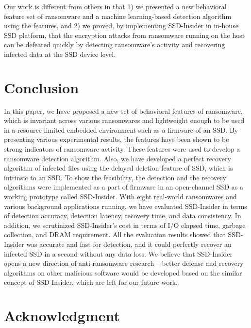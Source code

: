 \documentclass[conference]{IEEEtran}
\newcommand{\ours}{SSD-Insider}
\begin{document}
Our work is different from others in that 1) we presented a new
behavioral feature set of ransomware and a machine learning-based 
detection algorithm using the features, and
2) we proved, by implementing \ours{} in in-house SSD platform, 
that the encryption attacks from ransomware running on the host 
can be defeated quickly by detecting ransomware's activity and recovering infected data 
at the SSD device level.


\section{Conclusion}
In this paper, we have proposed a new set of behavioral features of
ransomware, which is invariant across various ransomwares and
lightweight enough to be used in a resource-limited embedded
environment such as a firmware of an SSD.  By presenting various
experimental results, the features have been shown to be strong
indicators of ransomware activity.  These features were used to
develop a ransomware detection algorithm.  Also, we have developed
a perfect recovery algorithm of infected files using the delayed
deletion feature of SSD, which is intrinsic to an SSD.  To show the
feasibility, the detection and the recovery algorithms were
implemented as a part of firmware in an open-channel SSD as a
working prototype called \ours{}.  With eight real-world
ransomwares and various background applications running, we have
evaluated \ours{} in terms of detection accuracy, detection
latency, recovery time, and data consistency. In addition, we
scrutinized \ours{}'s cost in terms of I/O elapsed time, garbage
collection, and DRAM requirement. All the evaluation results showed
that \ours{} was accurate and fast for detection, and it could
perfectly recover an infected SSD in a second without any data
loss.  We believe that \ours{} opens a new direction of
anti-ransomware research -- better defense and recovery algorithms
on other malicious software would be developed based on the similar
concept of SSD-Insider, which are left for our future work.



\section*{Acknowledgment}



\end{document}
